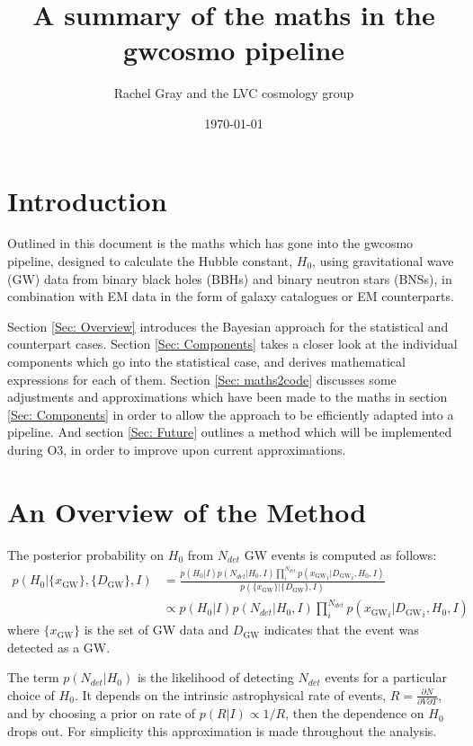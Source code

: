 \documentclass[a4paper,10pt]{article}
\title{A summary of the maths in the gwcosmo pipeline}
\author{Rachel Gray and the LVC cosmology group}
\date{\today} %
\begin{document}
\maketitle

\section{Introduction}
Outlined in this document is the maths which has gone into the gwcosmo pipeline, designed to calculate the Hubble constant, $H_0$, using gravitational wave (GW) data from binary black holes (BBHs) and binary neutron stars (BNSs), in combination with EM data in the form of galaxy catalogues or EM counterparts.

Section \ref{Sec: Overview} introduces the Bayesian approach for the statistical and counterpart cases.  Section \ref{Sec: Components} takes a closer look at the individual components which go into the statistical case, and derives mathematical expressions for each of them.  Section \ref{Sec: maths2code} discusses some adjustments and approximations which have been made to the maths in section \ref{Sec: Components} in order to allow the approach to be efficiently adapted into a pipeline.  And section \ref{Sec: Future} outlines a method which will be implemented during O3, in order to improve upon current approximations.


\section{An Overview of the Method \label{Sec: Overview}}


The posterior probability on $H_0$ from $N_{det}$ GW events is computed as follows:
\begin{equation}
\begin{aligned}
p(H_0|\{x_{\text{GW}}\},\{D_{\text{GW}}\},I)&=\frac{p(H_0|I)p(N_{det}|H_0,I)\prod_i^{N_{det}} p({x_{\text{GW}}}_i|{D_{\text{GW}}}_i,H_0,I)}{p(\{x_{\text{GW}}\}|\{D_{\text{GW}}\},I)}
\\ &\propto p(H_0|I)p(N_{det}|H_0,I)\prod_i^{N_{det}} p({x_{\text{GW}}}_i|{D_{\text{GW}}}_i,H_0,I)
\end{aligned}
\end{equation}
where $\{x_{\text{GW}}\}$ is the set of GW data and $D_{\text{GW}}$ indicates that the event was detected as a GW.

The term $p(N_{det}|H_0)$ is the likelihood of detecting $N_{det}$ events for a particular choice of $H_0$.  It depends on the intrinsic astrophysical rate of events, $R=\frac{\partial{N}}{\partial V \partial T}$, and by choosing a prior on rate of $p(R|I) \propto 1/R$, then the dependence on $H_0$ drops out. For simplicity this approximation is made throughout the analysis.
\end{document}
